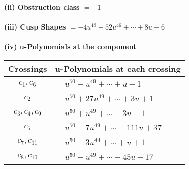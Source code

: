 \documentclass[1p]{elsarticle_modified}
\theoremstyle{definition}
\begin{document}
\flushleft \textbf{(ii) Obstruction class $= -1$}\\~\\
\flushleft \textbf{(iii) Cusp Shapes $= -4 u^{48}+52 u^{46}+\cdots+8 u-6$}\\~\\
\newpage\renewcommand{\arraystretch}{1}
\flushleft \textbf{(iv) u-Polynomials at the component}\newline \\
\begin{tabular}{m{50pt}|m{274pt}}
Crossings & \hspace{64pt}u-Polynomials at each crossing \\
\hline $$\begin{aligned}c_{1},c_{6}\end{aligned}$$&$\begin{aligned}
&u^{50}- u^{49}+\cdots+u-1
\end{aligned}$\\
\hline $$\begin{aligned}c_{2}\end{aligned}$$&$\begin{aligned}
&u^{50}+27 u^{49}+\cdots+3 u+1
\end{aligned}$\\
\hline $$\begin{aligned}c_{3},c_{4},c_{9}\end{aligned}$$&$\begin{aligned}
&u^{50}+u^{49}+\cdots-3 u-1
\end{aligned}$\\
\hline $$\begin{aligned}c_{5}\end{aligned}$$&$\begin{aligned}
&u^{50}-7 u^{49}+\cdots-111 u+37
\end{aligned}$\\
\hline $$\begin{aligned}c_{7},c_{11}\end{aligned}$$&$\begin{aligned}
&u^{50}-3 u^{49}+\cdots+u+1
\end{aligned}$\\
\hline $$\begin{aligned}c_{8},c_{10}\end{aligned}$$&$\begin{aligned}
&u^{50}- u^{49}+\cdots-45 u-17
\end{aligned}$\\
\hline
\end{tabular}\\~\\
\end{document}
